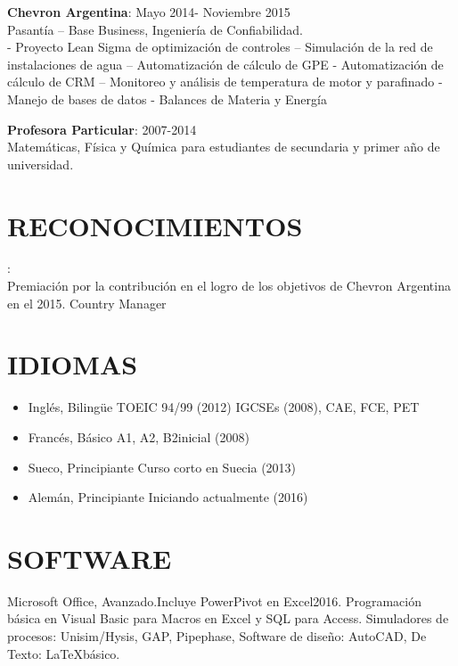 \documentclass[margin]{res}
\begin{document}
\begin{resume}
\textbf{Chevron Argentina}: \hfill Mayo 2014- Noviembre 2015
\\Pasantía – Base Business, Ingeniería de Confiabilidad.
\\- Proyecto Lean Sigma de optimización de controles – Simulación de la red de instalaciones de agua – Automatización de cálculo de GPE - Automatización de cálculo de CRM – Monitoreo y análisis de temperatura de motor y parafinado - Manejo de bases de datos - Balances de Materia y Energía 

\par
\textbf{Profesora Particular}: \hfill 2007-2014 
\\
Matemáticas, Física y Química para estudiantes de secundaria y primer año de universidad.

\section{RECONOCIMIENTOS}:
\\Premiación por la contribución en el logro de los objetivos de Chevron Argentina en el 2015.
Country Manager
\section{IDIOMAS}

\begin{itemize}
  \item Inglés,  Bilingüe \hfill TOEIC 94/99 (2012) IGCSEs (2008), CAE, FCE, PET
  \item Francés,  Básico	  \hfill A1, A2, B2inicial (2008)
  \item Sueco,  Principiante   \hfill  Curso corto en Suecia (2013)
  \item Alemán,  Principiante   \hfill  Iniciando actualmente (2016)  
\end{itemize}

\section{SOFTWARE}
  Microsoft Office, Avanzado.Incluye PowerPivot en Excel2016.
Programación básica en Visual Basic para Macros en Excel y SQL para Access.
Simuladores de procesos: Unisim/Hysis, GAP, Pipephase, Software de diseño: AutoCAD, De Texto: \LaTeX básico.



\end{resume}
\end{document}
